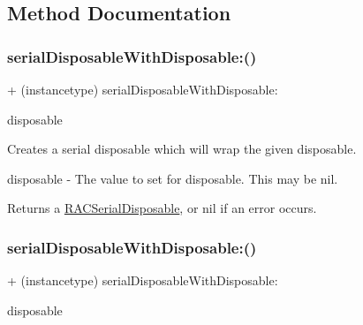 \subsection{Method Documentation}
\mbox{\label{interface_r_a_c_serial_disposable_a4d1effa565e832a3d4cea3257745f2c6}} 
\subsubsection{\texorpdfstring{serial\+Disposable\+With\+Disposable\+:()}{serialDisposableWithDisposable:()}\hspace{0.1cm}{\footnotesize\ttfamily [1/3]}}
{\footnotesize\ttfamily + (instancetype) serial\+Disposable\+With\+Disposable\+: \begin{DoxyParamCaption}\item[{(\mbox{\hyperlink{interface_r_a_c_disposable}{R\+A\+C\+Disposable}} $\ast$)}]{disposable }\end{DoxyParamCaption}}

Creates a serial disposable which will wrap the given disposable.

disposable -\/ The value to set for {\ttfamily disposable}. This may be nil.

Returns a \mbox{\hyperlink{interface_r_a_c_serial_disposable}{R\+A\+C\+Serial\+Disposable}}, or nil if an error occurs. \mbox{\label{interface_r_a_c_serial_disposable_a4d1effa565e832a3d4cea3257745f2c6}} 
\subsubsection{\texorpdfstring{serial\+Disposable\+With\+Disposable\+:()}{serialDisposableWithDisposable:()}\hspace{0.1cm}{\footnotesize\ttfamily [2/3]}}
{\footnotesize\ttfamily + (instancetype) serial\+Disposable\+With\+Disposable\+: \begin{DoxyParamCaption}\item[{(\mbox{\hyperlink{interface_r_a_c_disposable}{R\+A\+C\+Disposable}} $\ast$)}]{disposable }\end{DoxyParamCaption}}

